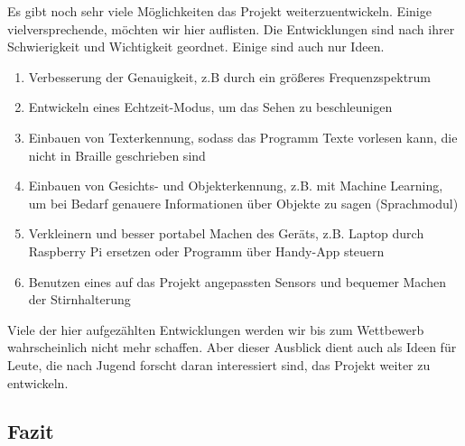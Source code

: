 \documentclass[a4paper,12pt,ngerman]{scrartcl}
\begin{document}
Es gibt noch sehr viele Möglichkeiten das Projekt weiterzuentwickeln. Einige vielversprechende,
möchten wir hier auflisten. Die Entwicklungen sind nach ihrer Schwierigkeit und Wichtigkeit geordnet. Einige sind auch nur Ideen.
\begin{enumerate}
	\item Verbesserung der Genauigkeit, z.B durch ein größeres Frequenzspektrum
	\item Entwickeln eines Echtzeit-Modus, um das Sehen zu beschleunigen
	\item Einbauen von Texterkennung, sodass das Programm Texte vorlesen kann, die nicht in Braille geschrieben sind
	\item Einbauen von Gesichts- und Objekterkennung, z.B. mit Machine Learning, um bei Bedarf genauere 
	Informationen über Objekte zu sagen (Sprachmodul)
	\item Verkleinern und besser portabel Machen des Geräts, z.B. Laptop durch Raspberry Pi ersetzen oder Programm über
	Handy-App steuern
	\item Benutzen eines auf das Projekt angepassten Sensors und bequemer Machen der Stirnhalterung
\end{enumerate}
Viele der hier aufgezählten Entwicklungen werden wir bis zum Wettbewerb wahrscheinlich nicht 
mehr schaffen. Aber dieser Ausblick dient auch als Ideen für Leute, die nach Jugend forscht 
daran interessiert sind, das Projekt weiter zu entwickeln. 

\subsection{Fazit}
\end{document}
